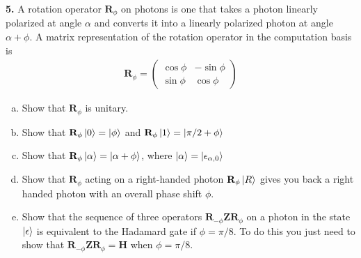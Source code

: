 \documentclass{book}
\theoremstyle{definition}
\newcommand{\al}{\alpha}
\newcommand{\Z}{\mathbf{Z}}
\newcommand{\had}{\mathbf{H}}
\begin{document}
\newpage














\noindent \textbf{5.} A rotation operator $\mathbf{R}_\phi$ on photons is one that takes a photon linearly polarized at angle $\alpha$ and converts it into a linearly polarized photon at angle $\al+\phi$. A matrix representation of the rotation operator in the computation basis is
\begin{align}
\mathbf{R}_\phi = \begin{pmatrix}
\cos\phi & -\sin\phi \\ \sin\phi & \cos\phi
\end{pmatrix}
\end{align}
\begin{enumerate}[(a)]
	\item Show that $\mathbf{R}_\phi$ is unitary.
	\item Show that $\mathbf{R}_\phi\ket{0} = \ket{\phi}$ and $\mathbf{R}_\phi \ket{1} = \ket{\pi/2+ \phi}$
	\item Show that $\mathbf{R}_\phi \ket{\al} = \ket{\al + \phi}$, where $\ket{\al} = \ket{\epsilon_{\alpha,0}}$
	\item Show that $\mathbf{R}_\phi$ acting on a right-handed photon $\mathbf{R}_\phi\ket{R}$ gives you back a right handed photon with an overall phase shift $\phi$.
	\item Show that the sequence of three operators $\mathbf{R}_{-\phi}\Z \mathbf{R}_\phi$ on a photon in the state $\ket{\epsilon}$ is equivalent to the Hadamard gate if $\phi = \pi/8$. To do this you just need to show that $\mathbf{R}_{-\phi}\Z \mathbf{R}_\phi = \had$ when $\phi = \pi/8$. 
\end{enumerate}
\end{document}
